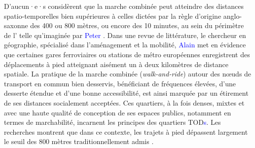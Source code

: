 \begin{refsegment}
D'aucun·e·s considèrent que la marche combinée peut atteindre des distances spatio-temporelles bien supérieures à celles dictées par la règle d’origine anglo-saxonne des 400 ou 800 mètres, ou encore des 10 minutes, au sein du périmètre de l’ telle qu’imaginée par \textcolor{blue}{Peter} \textcolor{blue}{\textcite[56]{calthorpe_next_1993}}. Dans une revue de littérature, le chercheur en géographie, spécialisé dans l'aménagement et la mobilité, \textcolor{blue}{Alain} \textcolor{blue}{\textcite[5]{lhostis_perimetres_2016}} met en évidence que certaines gares ferroviaires ou stations de métro européennes enregistrent des déplacements à pied atteignant aisément un à deux kilomètres de distance spatiale. La pratique de la marche combinée (\textsl{walk-and-ride}) autour des nœuds de transport en commun bien desservis, bénéficiant de fréquences élevées, d’une desserte étendue et d’une bonne accessibilité, est ainsi marquée par un étirement de ses distances socialement acceptées. Ces quartiers, à la fois denses, mixtes et avec une haute qualité de conception de ses espaces publics, notamment en termes de \gls{marchabilité}, incarnent les principes des quartiers \acrshort{TOD}\textcolor{blue}{s}. Les recherches montrent que dans ce contexte, les trajets à pied dépassent largement le seuil des 800 mètres traditionnellement admis \textcolor{blue}{\autocites[79]{ker_myths_2003}[7]{lhostis_perimetres_2016}[30]{hasiak_access_2019}}.%


\end{refsegment}
